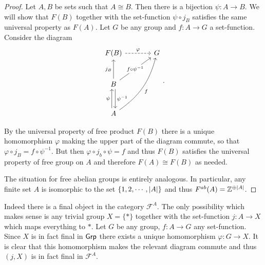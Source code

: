 \begin{proof}
	Let $A, B$ be sets such that $A \cong B$. Then there is a bijection $\psi: A \to B$. We will show that $F(B)$ together with the set-function $\psi \circ j_B$ satisfies the same universal property as $F(A)$. Let $G$ be any group and $f: A \to G$ a set-function. Consider the diagram
	\begin{equation*}
		\begin{tikzcd}[column sep=large, row sep=large]
			F(B)
			\arrow[r, dashrightarrow, "\varphi"]
			& G \\
			B
			\arrow[u, "j_B"]
			\arrow[ur, "f \circ \psi^{-1}" description]
			\arrow[d, shift left, "\psi^{-1}"]
			& \\
			A
			\arrow[u, shift left, "\psi"]
			\arrow[uur, bend right=20, "f"']
			&
		\end{tikzcd} \text{.}
	\end{equation*}
	
	By the universal property of free product $F(B)$ there is a unique homomorphism $\varphi$ making the upper part of the diagram commute, so that $\varphi \circ j_B = f \circ \psi^{-1}$. But then $\varphi \circ j_b \circ \psi = f$ and thus $F(B)$ satisfies the universal property of free group on $A$ and therefore $F(A) \cong F(B)$ as needed.
	
	The situation for free abelian groups is entirely analogous. In particular, any finite set $A$ is isomorphic to the set $\{ 1, 2, \cdots, \left|A\right| \}$ and thus $F^{ab}(A) = \mathbb{Z}^{\oplus \left|A\right|}$.
\end{proof}

\begin{problem}
\end{problem}

\begin{solution}
	Indeed there is a final object in the category $\mathscr{F}^{A}$. The only possibility which makes sense is any trivial group $X = \{*\}$ together with the set-function $j: A \to X$ which maps everything to $*$. Let $G$ be any group, $f: A \to G$ any set-function. Since $X$ is in fact final in $\mathsf{Grp}$ there exists a unique homomorphism $\varphi: G \to X$. It is clear that this homomorphism makes the relevant diagram commute and thus $(j, X)$ is in fact final in $\mathscr{F}^{A}$.
\end{solution}

\begin{problem}
\end{problem}

